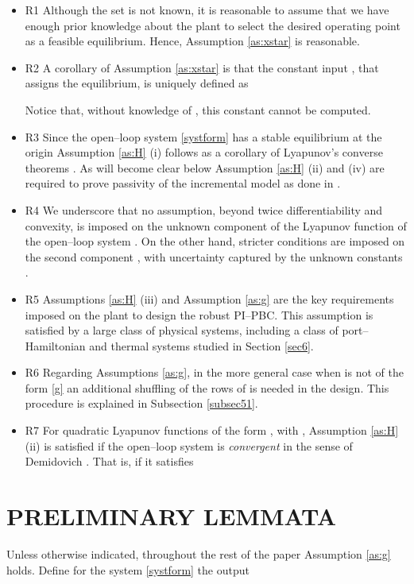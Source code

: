 \documentclass[10pt, conference]{ieeeconf}
\def\lab{\label}
\def\begite{\begin{itemize}}
\def\endite{\end{itemize}}
\begin{document}
\begite
\item[R1] Although the set  is not known, it is reasonable to assume that we have enough prior knowledge about the plant to select the desired operating point as a feasible equilibrium. Hence, Assumption \ref{as:xstar} is reasonable.

\item[R2] A corollary of Assumption \ref{as:xstar}  is that  the constant input , that assigns the equilibrium, is uniquely defined as

Notice that, without knowledge of , this constant cannot be computed.

\item[R3] Since the open--loop system \eqref{systform} has a stable equilibrium at the origin Assumption \ref{as:H} (i) follows as a corollary of Lyapunov's converse theorems \cite{KHA}. As will become clear below Assumption  \ref{as:H} (ii) and (iv) are required to prove passivity of the incremental model as done in \cite{JAYetal}. 

\item[R4] We underscore that no assumption, beyond twice differentiability and convexity, is imposed on the unknown component  of the  Lyapunov function of the open--loop system . On the other hand, stricter conditions are imposed on the second component , with uncertainty captured by the unknown constants .

\item[R5] Assumptions  \ref{as:H} (iii) and Assumption  \ref{as:g} are the key requirements imposed on the plant to design the robust PI--PBC. This assumption is satisfied by a large class of physical systems, including a class of port--Hamiltonian \cite{VAN}  and thermal systems studied in Section \ref{sec6}.

\item[R6] Regarding Assumptions  \ref{as:g}, in the more general case when  is not of the form \eqref{g} an additional shuffling of the rows of  is needed in the design. This procedure is explained in  Subsection \ref{subsec51}.

\item[R7] For quadratic Lyapunov functions of the form , with , Assumption  \ref{as:H} (ii) is satisfied if the open--loop system is {\em convergent} in the sense of Demidovich \cite{PAVetal}. That is, if it satisfies
  
\endite
\section{PRELIMINARY LEMMATA}
\lab{sec3}	
Unless otherwise indicated, throughout the rest of the paper Assumption \ref{as:g} holds. Define for the system \eqref{systform} the output
\end{document}
